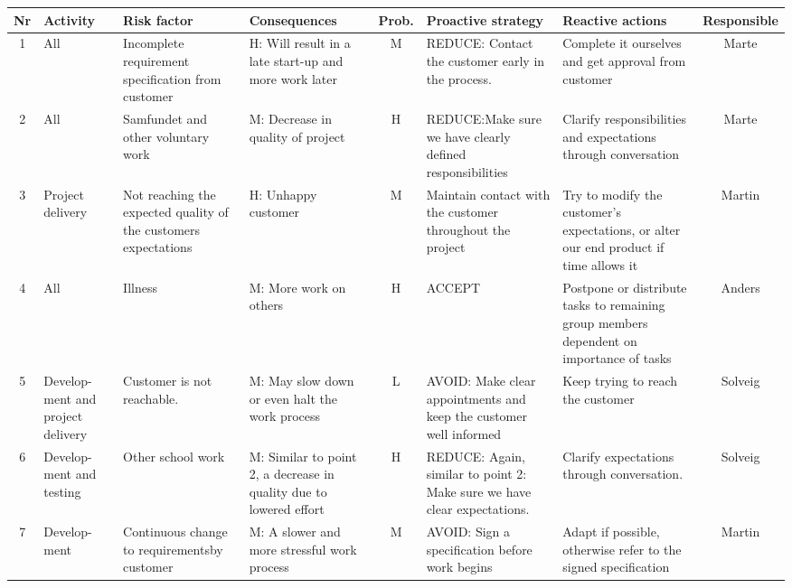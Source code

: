 \pagestyle{empty}
\begin{landscape}
	\addtolength{\oddsidemargin}{-1.1in}
	\addtolength{\topmargin}{0.5in}
  \begin{table}
	\begin{tabular}{| c | p{1.5cm} | p{4cm} | p{4cm} | c | p{4cm} | p{4cm} | c |}
    \hline
    \rowcolor{gray}
   	{\bf Nr} & {\bf Activity} & {\bf Risk factor} & {\bf Consequences} & {\bf Prob.} & {\bf Proactive strategy} & {\bf Reactive actions} & {\bf Responsible} \\ \hline

   	1 & All & Incomplete requirement specification from customer & H: Will result in a late start-up and more work later & M & REDUCE: Contact the customer early in the process. & Complete it ourselves and get approval from customer & Marte \\ \hline

   	2 & All & Samfundet and other voluntary work & M: Decrease in quality of project & H & REDUCE:Make sure we have clearly defined responsibilities & Clarify responsibilities and expectations through conversation & Marte \\ \hline

   	3 & Project delivery & Not reaching the expected quality of the customers expectations & H: Unhappy customer & M & Maintain contact with the customer throughout the project & Try to modify the customer’s expectations, or alter our end product if time allows it & Martin \\ \hline

   	4 & All & Illness & M: More work on others & H & ACCEPT & Postpone or distribute tasks to remaining group members dependent on importance of tasks & Anders \\ \hline

   	5 & Develop- ment and project delivery & Customer is not reachable. & M: May slow down or even halt the work process & L &
   	AVOID: Make clear appointments and keep the customer well informed & Keep trying to reach the customer & Solveig \\ \hline

   	6 & Develop- ment and testing & Other school work & M: Similar to point 2, a decrease in quality due to lowered effort& H & REDUCE: Again, similar to point 2: Make sure we have clear expectations. & 
	Clarify expectations through conversation. & Solveig \\ \hline

   	7 & Develop- ment & Continuous change to requirementsby customer & M: A slower and more stressful work process & M & AVOID: Sign a specification before work begins & Adapt if possible, otherwise refer to the signed specification & Martin \\ \hline


\end{tabular}
\end{table}
\end{landscape}
